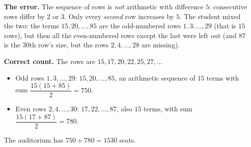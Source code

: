\textbf{The error.} The sequence of rows is \emph{not} arithmetic with difference $5$: consecutive rows differ by $2$ or $3$. Only every \emph{second} row increases by $5$. The student mixed the two: the terms $15,20,\dots,85$ are the odd-numbered rows $1,3,\dots,29$ (that is $15$ rows), but then all the even-numbered rows except the last were left out (and $87$ is the $30$th row's size, but the rows $2,4,\dots,28$ are missing).

\textbf{Correct count.} The rows are $15,17,20,22,25,27,\dots$
\begin{itemize}
\item Odd rows $1,3,\dots,29$: $15,20,\dots,85$, an arithmetic sequence of $15$ terms with sum $\dfrac{15(15+85)}{2}=750$.
\item Even rows $2,4,\dots,30$: $17,22,\dots,87$, also $15$ terms, with sum $\dfrac{15(17+87)}{2}=780$.
\end{itemize}
The auditorium has $750+780=\boxed{1530}$ seats.
